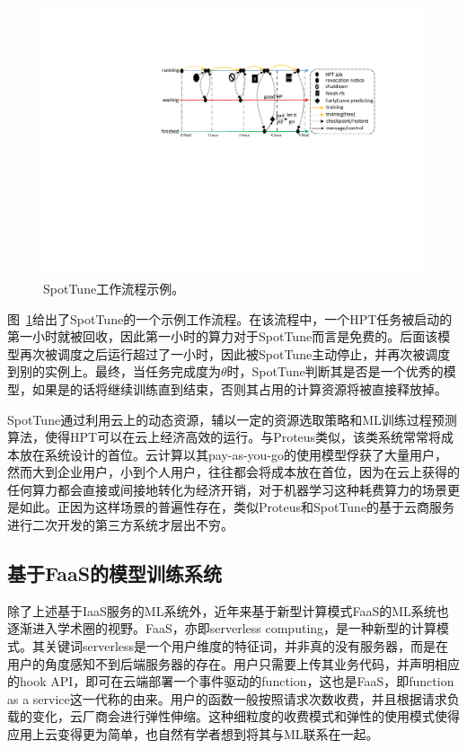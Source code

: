 \begin{figure}[h]
    \centerline{\includegraphics[width=\textwidth]{figures/example_workflow_fat_v4.pdf}}
    \caption{SpotTune工作流程示例。}
    \label{example_spottune}
\end{figure}

图~\ref{example_spottune}给出了SpotTune的一个示例工作流程。在该流程中，一个HPT任务被启动的第一小时就被回收，因此第一小时的算力对于SpotTune而言是免费的。后面该模型再次被调度之后运行超过了一小时，因此被SpotTune主动停止，并再次被调度到别的实例上。最终，当任务完成度为$\theta$时，SpotTune判断其是否是一个优秀的模型，如果是的话将继续训练直到结束，否则其占用的计算资源将被直接释放掉。

SpotTune通过利用云上的动态资源，辅以一定的资源选取策略和ML训练过程预测算法，使得HPT可以在云上经济高效的运行。与Proteus类似，该类系统常常将成本放在系统设计的首位。云计算以其pay-as-you-go的使用模型俘获了大量用户，然而大到企业用户，小到个人用户，往往都会将成本放在首位，因为在云上获得的任何算力都会直接或间接地转化为经济开销，对于机器学习这种耗费算力的场景更是如此。正因为这样场景的普遍性存在，类似Proteus和SpotTune的基于云商服务进行二次开发的第三方系统才层出不穷。

\subsection{基于FaaS的模型训练系统}
除了上述基于IaaS服务的ML系统外，近年来基于新型计算模式FaaS的ML系统也逐渐进入学术圈的视野。FaaS，亦即serverless computing，是一种新型的计算模式。其关键词serverless是一个用户维度的特征词，并非真的没有服务器，而是在用户的角度感知不到后端服务器的存在。用户只需要上传其业务代码，并声明相应的hook API，即可在云端部署一个事件驱动的function，这也是FaaS，即function as a service这一代称的由来。用户的函数一般按照请求次数收费，并且根据请求负载的变化，云厂商会进行弹性伸缩。这种细粒度的收费模式和弹性的使用模式使得应用上云变得更为简单，也自然有学者想到将其与ML联系在一起。

